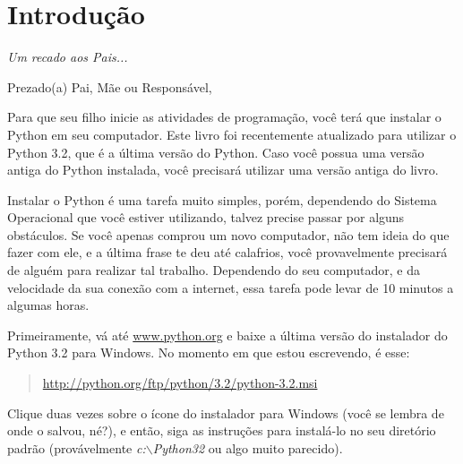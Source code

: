 

\chapter*{Introdução}\normalsize
\begin{center}
{\em Um recado aos Pais...}
\end{center}
\pagestyle{plain}

\noindent
Prezado(a) Pai, Mãe ou Responsável,

Para que seu filho inicie as atividades de programação, você terá que instalar o Python em seu computador. Este livro foi recentemente atualizado para utilizar o Python 3.2, que é a última versão do Python. Caso você possua uma versão antiga do Python instalada, você precisará utilizar uma versão antiga do livro.

Instalar o Python é uma tarefa muito simples, porém, dependendo do Sistema Operacional que você estiver utilizando, talvez precise passar por alguns obstáculos. Se você apenas comprou um novo computador, não tem ideia do que fazer com ele, e a última frase te deu até calafrios, você provavelmente precisará de alguém para realizar tal trabalho. Dependendo do seu computador, e da velocidade da sua conexão com a internet, essa tarefa pode levar de 10 minutos a algumas horas.

\begin{WINDOWS}

\noindent
Primeiramente, vá até \href{http://www.python.org}{www.python.org} e baixe a última versão do instalador do Python 3.2 para Windows. No momento em que estou escrevendo, é esse:
\begin{quote}
     \href{http://python.org/ftp/python/3.2/python-3.2.msi}{http://python.org/ftp/python/3.2/python-3.2.msi}
\end{quote}
Clique duas vezes sobre o ícone do instalador para Windows (você se lembra de onde o salvou, né?), e então, siga as instruções para instalá-lo no seu diretório padrão (provávelmente \emph{c:$\backslash$Python32} ou algo muito parecido).

\end{WINDOWS}

